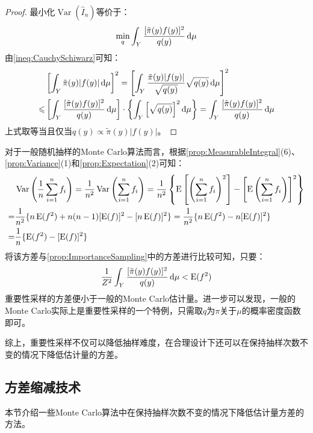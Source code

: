 \begin{proof}
	最小化$\operatorname{Var}(\hat{I}_n)$等价于：
	\begin{equation*}
		\min_{q}\int_{Y}\frac{[\tilde{\pi}(y)f(y)]^2}{q(y)}\mathop{}\!\mathrm{d}\mu
	\end{equation*}
	由\cref{ineq:CauchySchiwarz}可知：
	\begin{align*}
		&\left[\int_{Y}\tilde{\pi}(y)|f(y)|\mathop{}\!\mathrm{d}\mu\right]^2=\left[\int_{Y}\frac{\tilde{\pi}(y)|f(y)|}{\sqrt{q(y)}}\sqrt{q(y)}\mathop{}\!\mathrm{d}\mu\right]^2 \\
		\leqslant&\left[\int_{Y}\frac{[\tilde{\pi}(y)f(y)]^2}{q(y)}\mathop{}\!\mathrm{d}\mu\right]\cdot\left\{\int_{Y}\left[\sqrt{q(y)}\right]^2\mathop{}\!\mathrm{d}\mu\right\}=\int_{Y}\frac{[\tilde{\pi}(y)f(y)]^2}{q(y)}\mathop{}\!\mathrm{d}\mu
	\end{align*}
	上式取等当且仅当$q(y)\propto\tilde{\pi}(y)|f(y)|$。
\end{proof}
\begin{note}
	对于一般随机抽样的Monte Carlo算法而言，根据\cref{prop:MeasurableIntegral}(6)、\cref{prop:Variance}(1)和\cref{prop:Expectation}(2)可知：
	\begin{align*}
		&\operatorname{Var}\left(\dfrac{1}{n}\sum_{i=1}^{n}f_i\right)=\frac{1}{n^2}\operatorname{Var}\left(\sum_{i=1}^{n}f_i\right)=\frac{1}{n^2}\left\{\operatorname{E}\left[\left(\sum_{i=1}^{n}f_i\right)^2\right]-\left[\operatorname{E}\left(\sum_{i=1}^{n}f_i\right)\right]^2\right\} \\
		=&\frac{1}{n^2}\{n\operatorname{E}(f^2)+n(n-1)[\operatorname{E}(f)]^2-[n\operatorname{E}(f)]^2\}=\frac{1}{n^2}\{n\operatorname{E}(f^2)-n[\operatorname{E}(f)]^2\} \\
		=&\frac{1}{n}\{\operatorname{E}(f^2)-[\operatorname{E}(f)]^2\}\qedhere
	\end{align*}
	将该方差与\cref{prop:ImportanceSampling}中的方差进行比较可知，只要：
	\begin{equation*}
		\frac{1}{Z^2}\int_{Y}\frac{[\tilde{\pi}(y)f(y)]^2}{q(y)}\mathop{}\!\mathrm{d}\mu<\operatorname{E}(f^2)
	\end{equation*}
	重要性采样的方差便小于一般的Monte Carlo估计量。进一步可以发现，一般的Monte Carlo实际上是重要性采样的一个特例，只需取$q$为$\pi$关于$\mu$的概率密度函数即可。
\end{note}
综上，重要性采样不仅可以降低抽样难度，在合理设计下还可以在保持抽样次数不变的情况下降低估计量的方差。

\subsection{方差缩减技术}
本节介绍一些Monte Carlo算法中在保持抽样次数不变的情况下降低估计量方差的方法。
